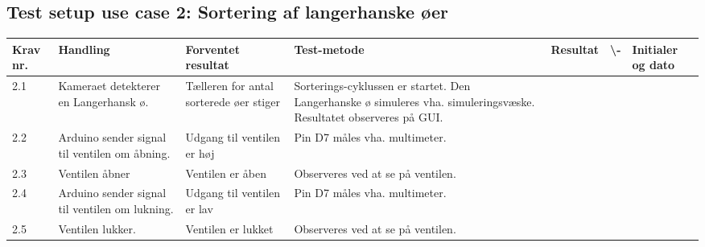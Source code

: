  \subsection{Test setup use case 2: Sortering af langerhanske øer}
\begin{center}
		\begin{longtable}{ | m{1.785cm} | m{1.785cm}| m{1.785cm}| m{1.785cm}| m{1.785cm}| m{1.785cm}|m{1.785cm}| } 
			\hline
			\textbf{Krav nr.} &\textbf{ Handling} & \textbf{Forventet resultat} & \textbf{Test-metode} &\textbf{Resultat} & \textbf{ \checkmark \textbackslash -} & \textbf{Initialer og dato} \\ 
			
			\hline
			2.1 &  Kameraet detekterer en Langerhansk ø. & Tælleren for antal sorterede øer stiger & Sorterings-cyklussen er startet. Den Langerhanske ø simuleres vha. simuleringsvæske. Resultatet observeres på GUI.  &  & & \\
			\hline
			
			\hline
			2.2 &  Arduino sender signal til ventilen om åbning. & Udgang til ventilen er høj & Pin D7 måles vha. multimeter. &  & & \\
			\hline
			
			2.3 &  Ventilen åbner  & Ventilen er åben & Observeres ved at se på ventilen.  &  & & \\
			\hline
			
			2.4 &  Arduino sender signal til ventilen om lukning.  & Udgang til ventilen er lav & Pin D7 måles vha. multimeter.  &  & & \\
			\hline
			
			2.5 &  Ventilen lukker. & Ventilen er lukket & Observeres ved at se på ventilen. &  & & \\
			\hline
			
			
		\end{longtable}
		
	\end{center}
	\pagebreak